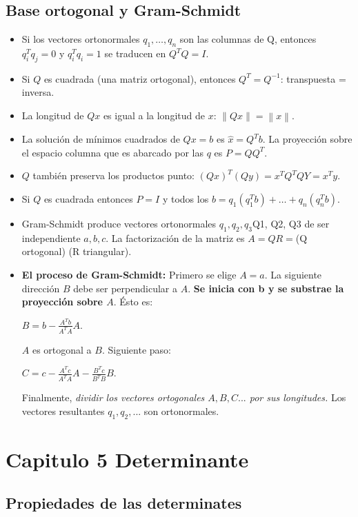 \documentclass[]{article}
\begin{document}
\subsection{Base ortogonal y Gram-Schmidt}
\begin{itemize}
	\item Si los vectores ortonormales $q_{1},\ldots,q_{n}$ son las columnas de Q, entonces $q_{i}^{T}q_{j}=0$ y $q_{i}^{T}q_{i}=1$ se traducen en $Q^{T}Q=I$.
	\item Si $Q$ es cuadrada (una matriz ortogonal), entonces $Q^{T}=Q^{-1}$: transpuesta = inversa.
	\item La longitud de $Qx$ es igual a la longitud de $x$: $\left \| Qx \right \|=\left \| x \right \|$.
	\item La solución de mínimos cuadrados de $Qx=b$ es $\widehat{x} = Q^T b$. La proyección sobre el espacio columna que es abarcado por las $q$ es $P = QQ^{T}$.
	\item $Q$ también preserva los productos punto: $(Qx)^T (Qy) = x^T Q^T QY = x^T y$.
	\item Si $Q$ es cuadrada entonces $P = I$ y todos los $b=q_{1}(q_{1}^{T}b)+\ldots+q_{n}(q_{n}^{T}b)$.
	\item Gram-Schmidt produce vectores ortonormales $q_{1},q_{2},q_{3}$Q1, Q2, Q3 de ser independiente $a, b, c$. La factorización de la matriz es $A = QR=$(Q ortogonal) (R triangular).

	\item \textbf{El proceso de Gram-Schmidt:} Primero se elige $A=a$. La siguiente dirección $B$ debe ser perpendicular a $A$. \textbf{Se inicia con b y se substrae la proyección sobre $A$}. Ésto es:

	$B = b - \frac{A^T b}{A^T A}A$.

	$A$ es ortogonal a $B$. Siguiente paso:

	$C = c - \frac{A^T c}{A^T A}A - \frac{B^T c}{B^T B}B$.

	Finalmente, {\it dividir los vectores ortogonales $A,B,C...$ por sus longitudes.} Los vectores resultantes $q_1,q_2,...$ son ortonormales.


\end{itemize}

\section{Capitulo 5 Determinante}

\subsection{Propiedades de las determinates}
\end{document}
